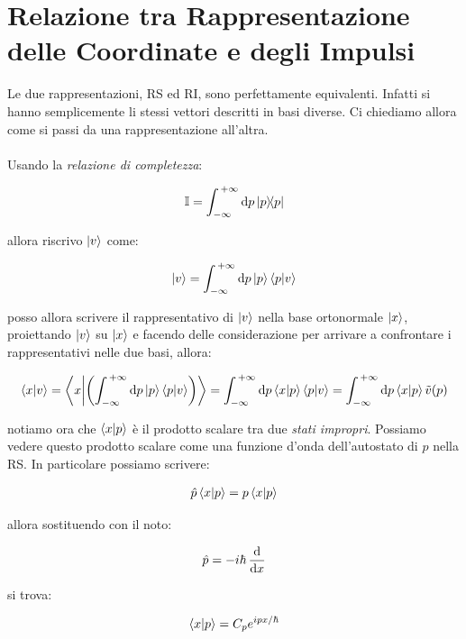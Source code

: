 \section{Relazione tra Rappresentazione delle Coordinate e degli
Impulsi}

	Le due rappresentazioni, RS ed RI, sono perfettamente equivalenti. Infatti si hanno semplicemente li stessi vettori descritti in basi diverse. Ci chiediamo allora come si passi da una rappresentazione all'altra.
	\\
	\\
	Usando la \textit{relazione di completezza}:
	
\begin{align*}
	\mathbb{I} = \int_{-\infty}^{\, +\infty} \dd p \ketbra{p}
\end{align*}

	allora riscrivo $\ket{v}$ come:
	
\begin{align*}
	\ket{v} = \int_{-\infty}^{\, +\infty} \dd p \ket{p} \braket{p}{v}
\end{align*}

	posso allora scrivere il rappresentativo di $\ket{v}$ nella base ortonormale $\ket{x}$, proiettando $\ket{v}$ su $\ket{x}$ e facendo delle considerazione per arrivare a confrontare i rappresentativi nelle due basi, allora:
	
\begin{align*}
	\braket{x}{v} = \braket{x}{\qty(\int_{-\infty}^{\, +\infty} \dd p \ket{p} \braket{p}{v})} = \int_{-\infty}^{\, +\infty} \dd p \braket{x}{p} \braket{p}{v} = \int_{-\infty}^{\, +\infty} \dd p \braket{x}{p} \tilde{v}(p)
\end{align*}

	notiamo ora che $\braket{x}{p}$ è il prodotto scalare tra due \textit{stati impropri}. Possiamo vedere questo prodotto scalare come una funzione d'onda dell'autostato di $p$ nella RS. In particolare possiamo scrivere:
	
\begin{align*}
	\hat{p}\braket{x}{p} = p \braket{x}{p}
\end{align*}

	allora sostituendo con il noto:
	
\begin{align*}
	\hat{p} = -i\hbar \, \dv{x}
\end{align*}

	si trova:
	
\begin{align*}
	\braket{x}{p} = C_p e^{ipx/\hbar}
\end{align*}

